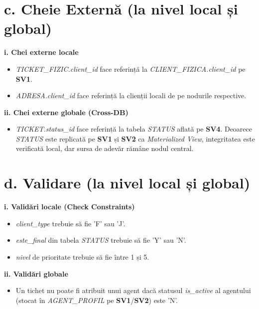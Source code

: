 \section*{c. Cheie Externă (la nivel local și global)}

\textbf{i. Chei externe locale}\\
\begin{itemize}
    \item \textit{TICKET\_FIZIC.client\_id} face referință la \textit{CLIENT\_FIZICA.client\_id} pe \textbf{SV1}.
    \item \textit{ADRESA.client\_id} face referință la clienții locali de pe nodurile respective.
\end{itemize}

\textbf{ii. Chei externe globale (Cross-DB)}\\
\begin{itemize}
    \item \textit{TICKET.status\_id} face referință la tabela \textit{STATUS} aflată pe \textbf{SV4}. Deoarece \textit{STATUS} este replicată pe \textbf{SV1} și \textbf{SV2} ca \textit{Materialized View}, integritatea este verificată local, dar sursa de adevăr rămâne nodul central.
\end{itemize}


\section*{d. Validare (la nivel local și global)}

\textbf{i. Validări locale (Check Constraints)}\\
\begin{itemize}
    \item \textit{client\_type} trebuie să fie 'F' sau 'J'.
    \item \textit{este\_final} din tabela \textit{STATUS} trebuie să fie 'Y' sau 'N'.
    \item \textit{nivel} de prioritate trebuie să fie între 1 și 5.
\end{itemize}

\textbf{ii. Validări globale}\\
\begin{itemize}
    \item Un tichet nu poate fi atribuit unui agent dacă statusul \textit{is\_active} al agentului (stocat în \textit{AGENT\_PROFIL} pe \textbf{SV1}/\textbf{SV2}) este 'N'.
\end{itemize}